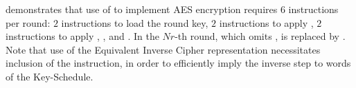 demonstrates that use of  to implement AES encryption requires
$ 6$ instructions per round:
$ 2$            
     instructions to load the round key,
$ 2$            
     instructions to apply ,
$ 2$   
     instructions to apply , , and .
In the $Nr$-th round, which omits ,
is replaced by 
     .
Note that use of the Equivalent Inverse Cipher representation
necessitates inclusion of the  instruction, in order
to efficiently imply the inverse  step to words
of the Key-Schedule.

